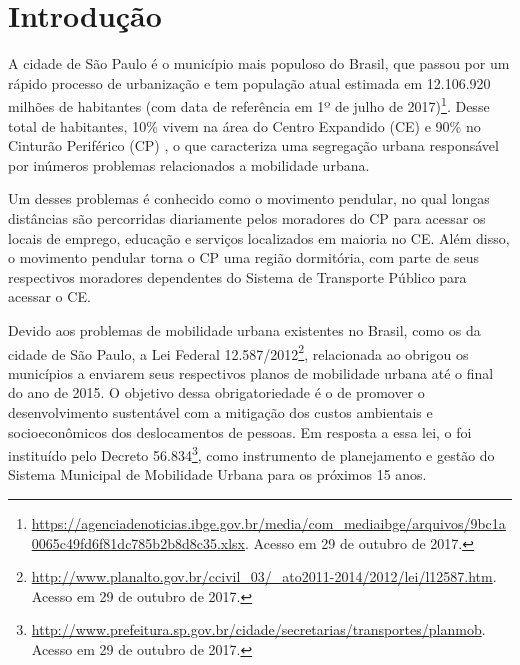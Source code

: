 \documentclass[
	12pt,				%
	oneside,			%
	a4paper,			%
	english,			%
	brazil				%
	]{abntex2ppgsi}
\begin{document}
\chapter{Introdução}
\label{introducao}


A cidade de São Paulo é o município mais populoso do Brasil, que passou por um rápido processo de urbanização e tem população atual estimada em 12.106.920 milhões de habitantes (com data de referência em 1º de julho de 2017)\footnote{\url{https://agenciadenoticias.ibge.gov.br/media/com\_mediaibge/arquivos/9bc1a0065c49fd6f81dc785b2b8d8c35.xlsx}. Acesso em 29 de outubro de 2017.}.
Desse total de habitantes, 10\% vivem na área do 
{Centro Expandido (CE)} e 90\% no 
{Cinturão Periférico (CP)}  \cite{SA201722}, o que caracteriza uma segregação urbana responsável por inúmeros problemas relacionados a mobilidade urbana.

Um desses problemas é conhecido como o movimento pendular, no qual longas distâncias são percorridas diariamente pelos moradores do CP para acessar os locais de emprego, educação e serviços localizados em maioria no CE. Além disso, o movimento pendular torna o CP  uma região dormitória, com parte de seus respectivos moradores dependentes do Sistema de Transporte Público para acessar o CE.

Devido aos problemas de mobilidade urbana existentes no Brasil, como os da cidade de São Paulo, a Lei Federal 12.587/2012\footnote{\url{http://www.planalto.gov.br/ccivil\_03/\_ato2011-2014/2012/lei/l12587.htm}. Acesso em 29 de outubro de 2017.}, relacionada ao  obrigou os municípios a enviarem seus respectivos planos de mobilidade urbana até o final do ano de 2015.  O objetivo dessa obrigatoriedade é o de promover o desenvolvimento sustentável com a mitigação dos custos ambientais e socioeconômicos dos deslocamentos de pessoas. Em resposta a essa lei, o  foi instituído pelo Decreto 56.834\footnote{\label{planmob}\url{http://www.prefeitura.sp.gov.br/cidade/secretarias/transportes/planmob}. Acesso em 29 de outubro de 2017.}, como instrumento de planejamento e gestão do Sistema Municipal de Mobilidade Urbana para os próximos 15 anos.
\end{document}
